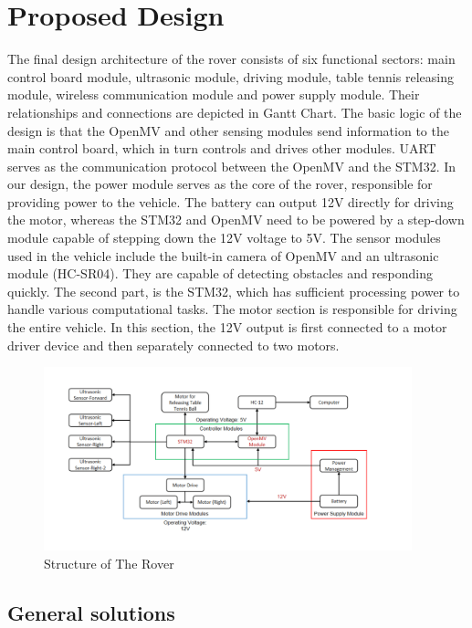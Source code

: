 \documentclass[12pt, a4paper, oneside]{report}
\begin{document}
	
\chapter{Proposed Design}

The final design architecture of the rover consists of six functional sectors: main control board module, ultrasonic module, driving module, table tennis releasing module, wireless communication module and power supply module. Their relationships and connections are depicted in Gantt Chart. The basic logic of the design is that the OpenMV and other sensing modules send information to the main control board, which in turn controls and drives other modules. UART serves as the communication protocol between the OpenMV and the STM32. In our design, the power module serves as the core of the rover, responsible for providing power to the vehicle. The battery can output 12V directly for driving the motor, whereas the STM32 and OpenMV need to be powered by a step-down module capable of stepping down the 12V voltage to 5V. The sensor modules used in the vehicle include the built-in camera of OpenMV and an ultrasonic module (HC-SR04). They are capable of detecting obstacles and responding quickly. The second part, is the STM32, which has sufficient processing power to handle various computational tasks. The motor section is responsible for driving the entire vehicle. In this section, the 12V output is first connected to a motor driver device and then separately connected to two motors.

\begin{figure}[H]
  \centering
  \includegraphics[width=0.95\textwidth]{pic/Proposed Design/Structure of The Rover.png}
  \caption{Structure of The Rover}
  \label{fig:Structure of The Rover}
\end{figure}

	
\section{General solutions}
	
\end{document}
